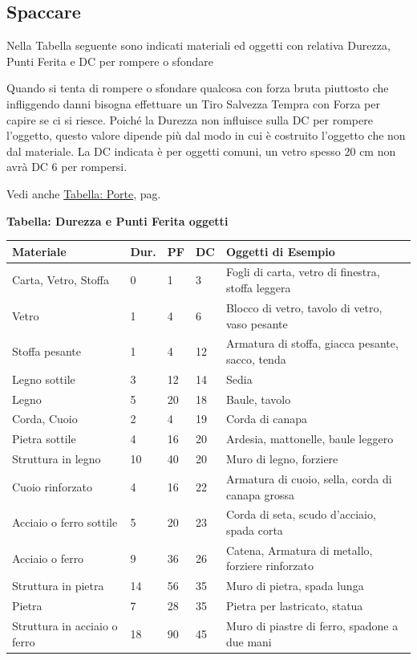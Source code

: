 \begin{multicols}{2}
\subsection{Spaccare}

Nella Tabella seguente sono indicati materiali ed oggetti con relativa Durezza, Punti Ferita e DC per rompere o sfondare

Quando si tenta di rompere o sfondare qualcosa con forza bruta piuttosto che infliggendo danni bisogna effettuare un Tiro Salvezza Tempra con Forza per capire se ci si riesce. Poiché la Durezza non influisce sulla DC per rompere l'oggetto, questo valore dipende più dal modo in cui è costruito l'oggetto che non dal materiale. La DC indicata è per oggetti comuni, un vetro spesso 20 cm non avrà DC 6 per rompersi.

Vedi anche \hyperlink{tabellaporte}{Tabella: Porte}, pag. \pageref{tabellaporte}

\end{multicols}

\textbf{Tabella: Durezza e Punti Ferita oggetti}\label{durezzaoggetti}

\noindent\begin{tabularx}{\linewidth}{Xllll}
\toprule
\rowcolor{gray!20}\textbf{Materiale} &\textbf{Dur.}&\textbf{PF} &\textbf{DC} & \textbf{Oggetti di Esempio}\\
\toprule
Carta, Vetro, Stoffa	&0	& 1	&	3&	Fogli di carta, vetro di finestra, stoffa leggera\\
\rowcolor{gray!20}Vetro					&1	& 4 &	6	&Blocco di vetro, tavolo di vetro, vaso pesante\\
Stoffa pesante 			&1	& 4 & 	12	&Armatura di stoffa, giacca pesante, sacco, tenda\\
\rowcolor{gray!20}Legno sottile			&3	& 12 &	14	&Sedia\\
Legno					&5	& 20 &	18	&Baule, tavolo\\
\rowcolor{gray!20}Corda, Cuoio			&2 	& 4	&	19	&Corda di canapa\\
Pietra sottile			&4	& 16 &	20	&Ardesia, mattonelle, baule leggero\\
\rowcolor{gray!20}Struttura in legno		&10	& 40 &	20	&Muro di legno, forziere\\
Cuoio rinforzato		&4	& 16 &	22	&Armatura di cuoio, sella, corda di canapa grossa\\
\rowcolor{gray!20}Acciaio o ferro sottile &5	& 20 &	23	&Corda di seta, scudo d'acciaio, spada corta\\
Acciaio o ferro			&9	& 36 &	26	&Catena, Armatura di metallo, forziere rinforzato\\
\rowcolor{gray!20}Struttura in pietra		&14	& 56 &	35	&Muro di pietra, spada lunga\\
Pietra					&7	& 28 &	35	&Pietra per lastricato, statua\\
\rowcolor{gray!20}Struttura in acciaio o ferro	&18	&90	&45	&Muro di piastre di ferro, spadone a due mani

\end{tabularx}

